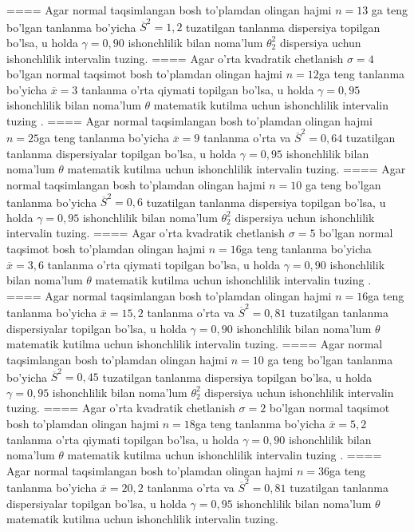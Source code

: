 ====
Agar normal taqsimlangan bosh to'plamdan olingan hajmi \(n = 13\) ga teng bo'lgan tanlanma bo'yicha \({\overline{S}}^{2} = 1,2\) tuzatilgan tanlanma dispersiya topilgan bo'lsa, u holda \(\gamma = 0,90\) ishonchlilik bilan noma'lum \(\theta_{2}^{2}\) dispersiya uchun ishonchlilik intervalin tuzing.
====
Agar o'rta kvadratik chetlanish \(\sigma = 4\) bo'lgan normal taqsimot bosh to'plamdan olingan hajmi \(n = 12\)ga teng tanlanma bo'yicha \(\overline{x} = 3\) tanlanma o'rta qiymati topilgan bo'lsa, u holda \(\gamma = 0,95\) ishonchlilik bilan noma'lum \(\theta\) matematik kutilma uchun ishonchlilik intervalin tuzing .
====
Agar normal taqsimlangan bosh to'plamdan olingan hajmi \(n = 25\)ga teng tanlanma bo'yicha \(\overline{x} = 9\) tanlanma o'rta va \({\overline{S}}^{2} = 0,64\) tuzatilgan tanlanma dispersiyalar topilgan bo'lsa, u holda \(\gamma = 0,95\) ishonchlilik bilan noma'lum \(\theta\) matematik kutilma uchun ishonchlilik intervalin tuzing.
====
Agar normal taqsimlangan bosh to'plamdan olingan hajmi \(n = 10\) ga teng bo'lgan tanlanma bo'yicha \({\overline{S}}^{2} = 0,6\) tuzatilgan tanlanma dispersiya topilgan bo'lsa, u holda \(\gamma = 0,95\) ishonchlilik bilan noma'lum \(\theta_{2}^{2}\) dispersiya uchun ishonchlilik intervalin tuzing.
====
Agar o'rta kvadratik chetlanish \(\sigma = 5\) bo'lgan normal taqsimot bosh to'plamdan olingan hajmi \(n = 16\)ga teng tanlanma bo'yicha \(\overline{x} = 3,6\) tanlanma o'rta qiymati topilgan bo'lsa, u holda \(\gamma = 0,90\) ishonchlilik bilan noma'lum \(\theta\) matematik kutilma uchun ishonchlilik intervalin tuzing .
====
Agar normal taqsimlangan bosh to'plamdan olingan hajmi \(n = 16\)ga teng tanlanma bo'yicha \(\overline{x} = 15,2\) tanlanma o'rta va \({\overline{S}}^{2} = 0,81\) tuzatilgan tanlanma dispersiyalar topilgan bo'lsa, u holda \(\gamma = 0,90\) ishonchlilik bilan noma'lum \(\theta\) matematik kutilma uchun ishonchlilik intervalin tuzing.
====
Agar normal taqsimlangan bosh to'plamdan olingan hajmi \(n = 10\) ga teng bo'lgan tanlanma bo'yicha \({\overline{S}}^{2} = 0,45\) tuzatilgan tanlanma dispersiya topilgan bo'lsa, u holda \(\gamma = 0,95\) ishonchlilik bilan noma'lum \(\theta_{2}^{2}\) dispersiya uchun ishonchlilik intervalin tuzing.
====
Agar o'rta kvadratik chetlanish \(\sigma = 2\) bo'lgan normal taqsimot bosh to'plamdan olingan hajmi \(n = 18\)ga teng tanlanma bo'yicha \(\overline{x} = 5,2\) tanlanma o'rta qiymati topilgan bo'lsa, u holda \(\gamma = 0,90\) ishonchlilik bilan noma'lum \(\theta\) matematik kutilma uchun ishonchlilik intervalin tuzing .
====
Agar normal taqsimlangan bosh to'plamdan olingan hajmi \(n = 36\)ga teng tanlanma bo'yicha \(\overline{x} = 20,2\) tanlanma o'rta va \({\overline{S}}^{2} = 0,81\) tuzatilgan tanlanma dispersiyalar topilgan bo'lsa, u holda \(\gamma = 0,95\) ishonchlilik bilan noma'lum \(\theta\) matematik kutilma uchun ishonchlilik intervalin tuzing.

